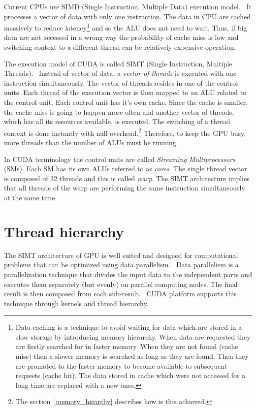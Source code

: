 \documentclass[12pt,oneside]{fithesis2}
\begin{document}
Current CPUs use SIMD (Single Instruction, Multiple Data) execution model.~\cite{professional_cuda} It processes a vector of data with only one instruction. The data in CPU are cached massively to reduce latency\footnote{Data caching is a technique to avoid waiting for data which are stored in a slow storage by introducing memory hierarchy. When data are requested they are firstly searched for in faster memory. When they are not found (cache miss) then a slower memory is searched as long as they are found. Then they are promoted to the faster memory to become available to subsequent requests (cache hit). The data stored in cache which were not accessed for a long time are replaced with a new ones.} and so the ALU does not need to wait. Thus, if big data are not accessed in a wrong way the probability of cache miss is low and switching context to a different thread can be relatively expensive operation.

The execution model of CUDA is called SIMT (Single Instruction, Multiple Threads).~\cite{professional_cuda} Instead of vector of data, a \emph{vector of threads} is executed with one instruction simultaneously. The vector of threads resides in one of the control units. Each thread of the execution vector is then mapped to an ALU related to the control unit. Each control unit has it's own cache. Since the cache is smaller, the cache miss is going to happen more often and another vector of threads, which has all its resources available, is executed. The switching of a thread context is done instantly with null overhead.\footnote{The section~\ref{memory_hiearchy} describes how is this achieved.} Therefore, to keep the GPU busy, more threads than the number of ALUs must be running.

In CUDA terminology the control units are called \emph{Streaming Multiprocessors} (SMs). Each SM has its own ALUs referred to as \emph{cores}. The single thread vector is composed of 32 threads and this is called \emph{warp}. The SIMT architecture implies that all threads of the warp are performing the same instruction simultaneously at the same time.~\cite{cuda_guide}


\section{Thread hierarchy}

The SIMT architecture of GPU is well suited and designed for computational problems that can be optimized using data parallelism.~\cite{professional_cuda} Data parallelism is a parallelization technique that divides the input data to the independent parts and executes them separately (but evenly) on parallel computing nodes. The final result is then composed from each sub-result.~\cite{data_parallel_algorithms} CUDA platform supports this technique through kernels and thread hierarchy.
\end{document}
